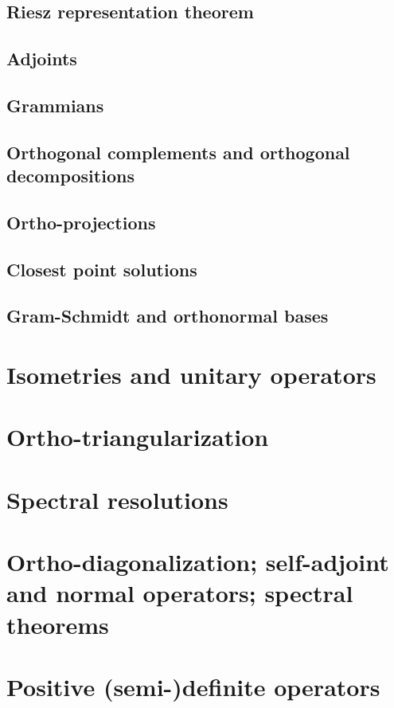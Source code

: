 \documentclass{article}
\theoremstyle{definition}
\begin{document}
\subsection{Riesz representation theorem}
\subsection{Adjoints}
\subsection{Grammians}
\subsection{Orthogonal complements and orthogonal decompositions}
\subsection{Ortho-projections}
\subsection{Closest point solutions}
\subsection{Gram-Schmidt and orthonormal bases}

\newpage

\section{Isometries and unitary operators}
\newpage 

\section{Ortho-triangularization}
\newpage 

\section{Spectral resolutions}
\newpage 

\section{Ortho-diagonalization; self-adjoint and normal operators; spectral theorems}
\newpage 

\section{Positive (semi-)definite operators}
\end{document}
